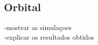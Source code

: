 \subsection{Orbital}
\label{subsec:orbital_experiments}

-mostrar as simulaçoes\\
-explicar os resultados obtidos
























